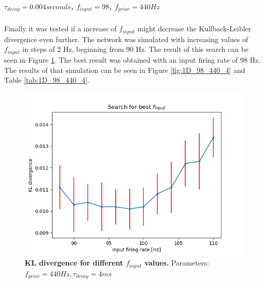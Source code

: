 \subparagraph{$\tau_{decay} = 0.004 seconds$, $f_{input} = 98$, $f_{prior} = 440 Hz$}
Finally it was tested if a increase of $f_{input}$ might decrease the Kullback-Leibler divergence even further. The network was simulated with increasing values of $f_{input}$ in steps of 2 Hz, beginning from 90 Hz. The result of this search can be seen in Figure \ref{fig:1D_KLD_fPrior440_tau4}. The best result was obtained with an input firing rate of 98 Hz. The results of that simulation can be seen in Figure \ref{fig:1D_98_440_4} and Table \ref{tab:1D_98_440_4}.

\begin{figure}
  \includegraphics[width=\linewidth]{figures/1D/KLDvsfInput_fPrior440tau4.png}
  \caption{\textbf{KL divergence for different $f_{input}$ values.} Parameters: $f_{prior} = 440 Hz, \tau_{decay} = 4 ms$}
  \label{fig:1D_KLD_fPrior440_tau4}
\end{figure}

